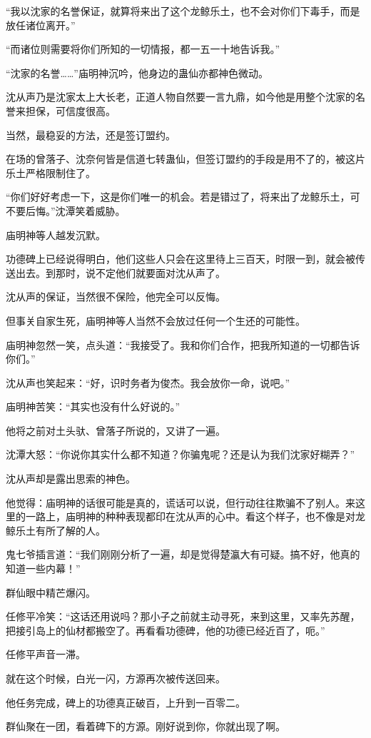 \begin{this_body}
“我以沈家的名誉保证，就算将来出了这个龙鲸乐土，也不会对你们下毒手，而是放任诸位离开。”

“而诸位则需要将你们所知的一切情报，都一五一十地告诉我。”

“沈家的名誉……”庙明神沉吟，他身边的蛊仙亦都神色微动。

沈从声乃是沈家太上大长老，正道人物自然要一言九鼎，如今他是用整个沈家的名誉来担保，可信度很高。

当然，最稳妥的方法，还是签订盟约。

在场的曾落子、沈奈何皆是信道七转蛊仙，但签订盟约的手段是用不了的，被这片乐土严格限制住了。

“你们好好考虑一下，这是你们唯一的机会。若是错过了，将来出了龙鲸乐土，可不要后悔。”沈潭笑着威胁。

庙明神等人越发沉默。

功德碑上已经说得明白，他们这些人只会在这里待上三百天，时限一到，就会被传送出去。到那时，说不定他们就要面对沈从声了。

沈从声的保证，当然很不保险，他完全可以反悔。

但事关自家生死，庙明神等人当然不会放过任何一个生还的可能性。

庙明神忽然一笑，点头道：“我接受了。我和你们合作，把我所知道的一切都告诉你们。”

沈从声也笑起来：“好，识时务者为俊杰。我会放你一命，说吧。”

庙明神苦笑：“其实也没有什么好说的。”

他将之前对土头驮、曾落子所说的，又讲了一遍。

沈潭大怒：“你说你其实什么都不知道？你骗鬼呢？还是认为我们沈家好糊弄？”

沈从声却是露出思索的神色。

他觉得：庙明神的话很可能是真的，谎话可以说，但行动往往欺骗不了别人。来这里的一路上，庙明神的种种表现都印在沈从声的心中。看这个样子，也不像是对龙鲸乐土有所了解的人。

鬼七爷插言道：“我们刚刚分析了一遍，却是觉得楚瀛大有可疑。搞不好，他真的知道一些内幕！”

群仙眼中精芒爆闪。

任修平冷笑：“这话还用说吗？那小子之前就主动寻死，来到这里，又率先苏醒，把接引岛上的仙材都搬空了。再看看功德碑，他的功德已经近百了，呃。”

任修平声音一滞。

就在这个时候，白光一闪，方源再次被传送回来。

他任务完成，碑上的功德真正破百，上升到一百零二。

群仙聚在一团，看着碑下的方源。刚好说到你，你就出现了啊。


\end{this_body}
